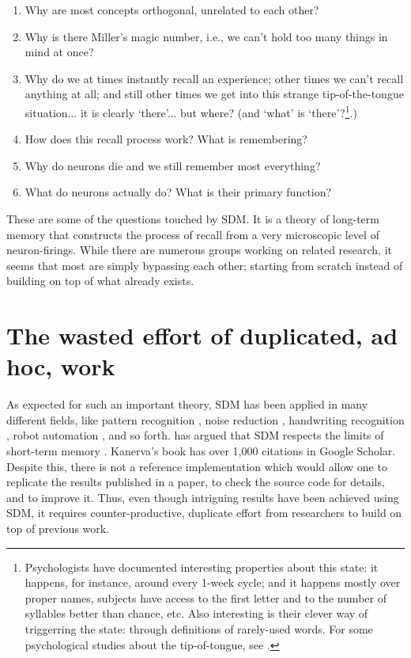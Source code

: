 \begin{enumerate}
    \item Why are most concepts orthogonal, unrelated to each other?
    \item Why is there Miller's magic number, i.e., we can't hold too many things in mind at once?
    \item Why do we at times instantly recall an experience; other times we can't recall anything at all; and still other times we get into this strange tip-of-the-tongue situation... it is clearly `there'... but where?  (and `what' is `there'?\footnote{Psychologists have documented interesting properties about this state:  it happens, for instance, around every 1-week cycle; and it happens mostly over proper names, subjects have access to the first letter and to the number of syllables better than chance, etc. Also interesting is their clever way of triggerring the state: through definitions of rarely-used words.  For some psychological studies about the tip-of-tongue, see \citet{meyer_tip---tongue_1992, brown_review_1991, brown_tip_1966}.}.)
    \item How does this recall process work?  What is remembering?
    \item Why do neurons die and we still remember most everything?
    \item What do neurons actually do?  What is their primary function?
\end{enumerate}

These are some of the questions touched by SDM.  It is a theory of long-term memory that constructs the process of recall from a very microscopic level of neuron-firings. While there are numerous groups working on related research, it seems that most are simply bypassing each other; starting from scratch instead of building on top of what already exists.


\section{The wasted effort of duplicated, ad hoc, work}

As expected for such an important theory, SDM has been applied in many different fields, like pattern recognition \citep{norman2003modeling, rao1995natural}, noise reduction \citep{Meng2009}, handwriting recognition \citep{fan1997genetic}, robot automation \citep{Rajesh1998, mendes2008robot}, and so forth. \citet{Linhares2011} has argued that SDM respects the limits of short-term memory \citep{Miller1955, Cowan2001}. Kanerva's book has over 1,000 citations in Google Scholar.  Despite this, there is not a reference implementation which would allow one to replicate the results published in a paper, to check the source code for details, and to improve it. Thus, even though intriguing results have been achieved using SDM, it requires counter-productive, duplicate effort from researchers to build on top of previous work.

